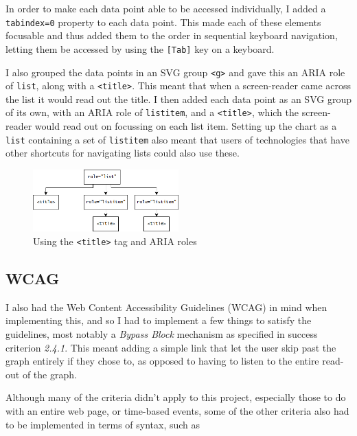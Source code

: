 \documentclass[ %
                    author={Aleena Baig},
                supervisor={Dr Simon Lock},
                    degree={BSc},
                     title={On Making Web Accessible Graphs},
                  subtitle={},
                      year={2019} ]{dissertation}
\begin{document}
In order to make each data point able to be accessed individually, I added a \texttt{tabindex=0} property to each data point. This made each of these elements focusable and thus added them to the order in sequential keyboard navigation, letting them be accessed by using the \texttt{[Tab]} key on a keyboard.

I also grouped the data points in an SVG group \texttt{<g>} and gave this an ARIA role of \texttt{list}, along with a \texttt{<title>}. This meant that when a screen-reader came across the list it would read out the title. I then added each data point as an SVG group of its own, with an ARIA role of \texttt{listitem}, and a \texttt{<title>}, which the screen-reader would read out on focussing on each list item. Setting up the chart as a \texttt{list} containing a set of \texttt{listitem} also meant that users of technologies that have other shortcuts for navigating lists could also use these.

\begin{figure}[h]
\caption{Using the \texttt{<title>} tag and ARIA roles}
\centering
\includegraphics[width=0.5\textwidth]{images/listitemnesting.png}
\end{figure}

\subsection{WCAG}

I also had the Web Content Accessibility Guidelines (WCAG) in mind when implementing this, and so I had to implement a few things to satisfy the guidelines, most notably a \textit{Bypass Block} mechanism as specified in success criterion \textit{2.4.1}. This meant adding a simple link that let the user skip past the graph entirely if they chose to, as opposed to having to listen to the entire read-out of the graph.

Although many of the criteria didn't apply to this project, especially those to do with an entire web page, or time-based events, some of the other criteria also had to be implemented in terms of syntax, such as
\end{document}
